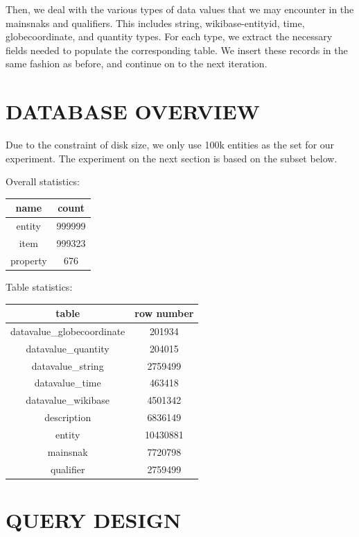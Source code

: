 \documentclass[12pt]{article}
\begin{document}
Then, we deal with the various types of data values that we may encounter in the mainsnaks and qualifiers. This includes string, wikibase-entityid, time, globecoordinate, and quantity types. For each type, we extract the necessary fields needed to populate the corresponding table. We insert these records in the same fashion as before, and continue on to the next iteration.

\section{DATABASE OVERVIEW}

Due to the constraint of disk size, we only use 100k entities as the set for our experiment. The experiment on the next section is based on the subset below.

Overall statistics:
\begin{center}
  \begin{tabular}{ | c | c |}
    \hline
    name & count \\ \hline\hline
    entity & 999999 \\ \hline
    item & 999323 \\ \hline
    property & 676 \\
    \hline
  \end{tabular}
\end{center}

Table statistics:
\begin{center}
  \begin{tabular}{ | c | c |}
    \hline
    table & row number \\ \hline\hline
    datavalue\_globecoordinate & 201934 \\ \hline
    datavalue\_quantity & 204015 \\ \hline
    datavalue\_string & 2759499 \\ \hline
    datavalue\_time & 463418 \\ \hline
    datavalue\_wikibase & 4501342 \\ \hline
    description & 6836149 \\ \hline
    entity & 10430881 \\ \hline
    mainsnak & 7720798 \\ \hline
    qualifier & 2759499 \\
    \hline
  \end{tabular}
\end{center}

\section{QUERY DESIGN}
\end{document}
